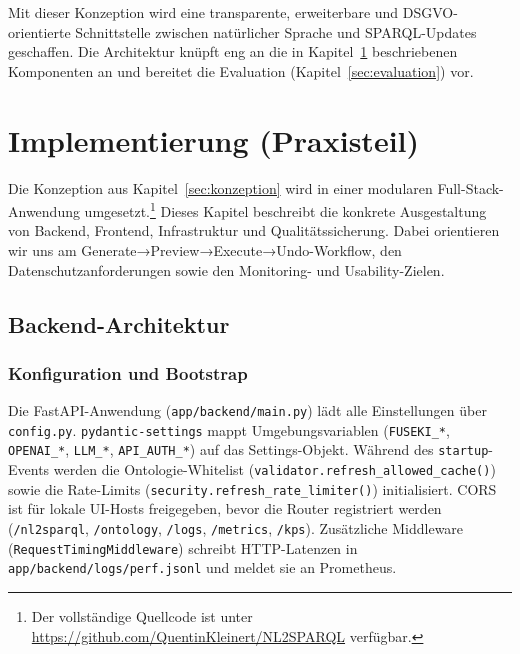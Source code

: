 \medskip
Mit dieser Konzeption wird eine transparente, erweiterbare und DSGVO-orientierte Schnittstelle zwischen natürlicher Sprache und SPARQL-Updates geschaffen. Die Architektur knüpft eng an die in Kapitel~\ref{sec:implementierung} beschriebenen Komponenten an und bereitet die Evaluation (Kapitel~\ref{sec:evaluation}) vor.





\chapter{Implementierung (Praxisteil)}
\label{sec:implementierung}

Die Konzeption aus Kapitel~\ref{sec:konzeption} wird in einer modularen Full-Stack-Anwendung umgesetzt.\footnote{Der vollständige Quellcode ist unter \url{https://github.com/QuentinKleinert/NL2SPARQL} verfügbar.} Dieses Kapitel beschreibt die konkrete Ausgestaltung von Backend, Frontend, Infrastruktur und Qualitätssicherung. Dabei orientieren wir uns am Generate→Preview→Execute→Undo-Workflow, den Datenschutzanforderungen sowie den Monitoring- und Usability-Zielen.

\section{Backend-Architektur}

\subsection{Konfiguration und Bootstrap}
Die FastAPI-Anwendung (\texttt{app/backend/main.py}) lädt alle Einstellungen über \texttt{config.py}. \texttt{pydantic-settings} mappt Umgebungsvariablen (\texttt{FUSEKI\_*}, \texttt{OPENAI\_*}, \texttt{LLM\_*}, \texttt{API\_AUTH\_*}) auf das Settings-Objekt. Während des \texttt{startup}-Events werden die Ontologie-Whitelist (\texttt{validator.refresh\_allowed\_cache()}) sowie die Rate-Limits (\texttt{security.refresh\_rate\_limiter()}) initialisiert. CORS ist für lokale UI-Hosts freigegeben, bevor die Router registriert werden (\texttt{/nl2sparql}, \texttt{/ontology}, \texttt{/logs}, \texttt{/metrics}, \texttt{/kps}). Zusätzliche Middleware (\texttt{RequestTimingMiddleware}) schreibt HTTP-Latenzen in \texttt{app/backend/logs/perf.jsonl} und meldet sie an Prometheus.

